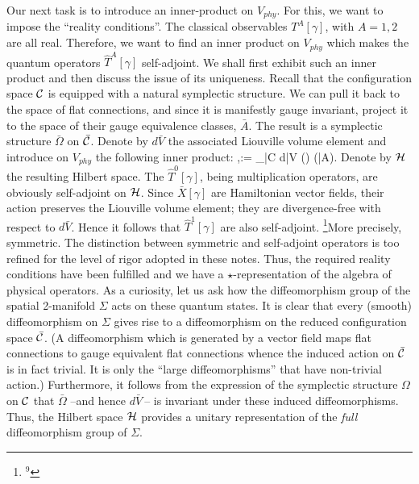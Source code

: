 Our next task is to introduce an inner-product on $V_{phy}$. For this, we
want to impose the ``reality conditions''. The classical observables
$T^A[\gamma ]$, with $A=1,2$ are all real. Therefore, we want to find an
inner product on
$V_{phy}$ which makes the quantum operators ${\hat T}^A[\gamma ]$ self-adjoint.
We shall first exhibit such an inner product and then discuss the issue of its
uniqueness. Recall that the configuration space ${\cal C}$ is equipped with a
natural symplectic structure. We can pull it back to the space of flat
connections, and since it is manifestly gauge invariant, project it to the
space of their gauge equivalence classes, $\bar{A}$. The result is a symplectic
structure $\bar\Omega$ on $\bar{\cal C}$. Denote by $d\bar{V}$ the associated
Liouville volume element and introduce on $V_{phy}$ the following inner
product:
\bneq
\langle\Psi\>,\>\Phi\rangle := \lint_{\bar{\cal C}} d\bar{V}\>
\>() \Phi (\bar{A})\>\>.
Denote by ${\cal H}$ the resulting Hilbert space. The ${\hat T}^0[\gamma ]$,
being multiplication operators, are obviously self-adjoint on ${\cal H}$.
Since $\bar{X}[\gamma ]$ are Hamiltonian vector fields, their action preserves
the Liouville volume element; they are divergence-free with respect to
$d\bar{V}$. Hence it follows that ${\hat T}^1[\gamma ]$ are also self-adjoint.%
\footnote{$^9$}{More precisely, symmetric. The distinction between symmetric
and self-adjoint operators is too refined for the level of rigor adopted in
these notes.} Thus, the required reality conditions have been fulfilled and
we have a $\star$-representation of the algebra of physical operators. As a
curiosity, let us ask how the diffeomorphism group of the spatial 2-manifold
$\Sigma$ acts on these quantum states. It is clear that every (smooth)
diffeomorphism on $\Sigma$ gives rise to a diffeomorphism on the reduced
configuration space $\bar{\cal C}$. (A diffeomorphism which is generated by a
vector field maps flat connections to gauge equivalent flat connections whence
the induced action on $\bar{\cal C}$ is in fact trivial. It is only the
``large diffeomorphisms'' that have non-trivial action.) Furthermore, it
follows from the expression of the symplectic structure $\Omega$ on ${\cal C}$
that $\bar\Omega$ --and hence $d\bar{V}\>$-- is invariant under these induced
diffeomorphisms. Thus, the Hilbert space ${\cal H}$ provides a unitary
representation of the {\it full} diffeomorphism group of $\Sigma$.

